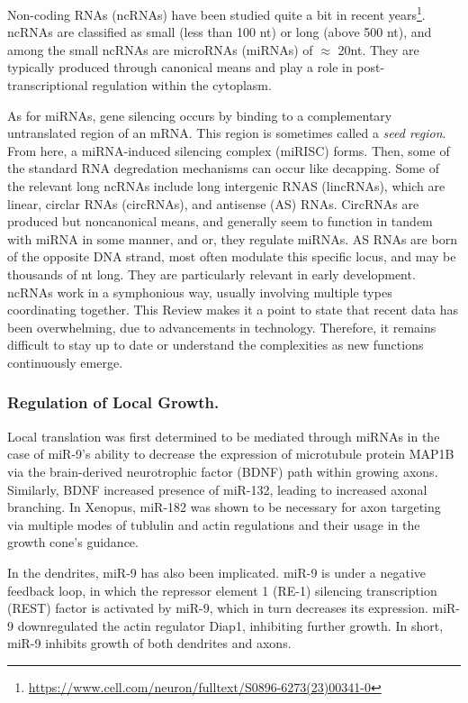 Non-coding RNAs (ncRNAs) have been studied quite a bit in recent years\footnote{\url{https://www.cell.com/neuron/fulltext/S0896-6273(23)00341-0}}. ncRNAs are classified as small (less than 100 nt) or long (above 500 nt), and among the small ncRNAs are microRNAs (miRNAs) of $\approx$ 20nt. They are typically produced through canonical means and play a role in post-transcriptional regulation within the cytoplasm.\newline

As for miRNAs, gene silencing occurs by binding to a complementary untranslated region of an mRNA. This region is sometimes called a \textit{seed region}. From here, a miRNA-induced silencing complex (miRISC) forms. Then, some of the standard RNA degredation mechanisms can occur like decapping. Some of the relevant long ncRNAs include long intergenic RNAS (lincRNAs), which are linear, circlar RNAs (circRNAs), and antisense (AS) RNAs. CircRNAs are produced but noncanonical means, and generally seem to function in tandem with miRNA in some manner, and or, they regulate miRNAs. AS RNAs are born of the opposite DNA strand, most often modulate this specific locus, and may be thousands of nt long. They are particularly relevant in early development. ncRNAs work in a symphonious way, usually involving multiple types coordinating together. This Review makes it a point to state that recent data has been overwhelming, due to advancements in technology. Therefore, it remains difficult to stay up to date or understand the complexities as new functions continuously emerge.

\subsubsection{Regulation of Local Growth.}

Local translation was first determined to be mediated through miRNAs in the case of miR-9's ability to decrease the expression of microtubule protein MAP1B via the brain-derived neurotrophic factor (BDNF) path within growing axons. Similarly, BDNF increased presence of miR-132, leading to increased axonal branching. In Xenopus, miR-182 was shown to be necessary for axon targeting via multiple modes of tublulin and actin regulations and their usage in the growth cone's guidance.\newline

In the dendrites, miR-9 has also been implicated. miR-9 is under a negative feedback loop, in which the repressor element 1 (RE-1) silencing transcription (REST) factor is activated by miR-9, which in turn decreases its expression. miR-9 downregulated the actin regulator Diap1, inhibiting further growth. In short, miR-9 inhibits growth of both dendrites and axons.\newline

